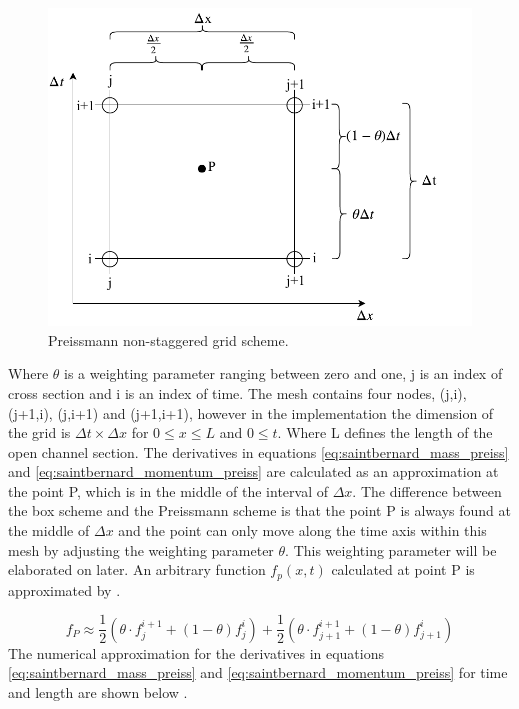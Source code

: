 \begin{figure}[H]
\centering
%
\includegraphics[width=.8\textwidth]{report/simulation/pictures/preissmann_scheme.pdf}
\caption{Preissmann non-staggered grid scheme.}
\label{fig:preissmann_grid_scheme}
\end{figure}
Where $\theta$ is a weighting parameter ranging between zero and one, j is an index of cross section and i is an index of time. The mesh contains four nodes, (j,i), (j+1,i), (j,i+1) and (j+1,i+1), however in the implementation the dimension of the grid is $\Delta t \times \Delta x$ for $0 \leq x \leq L$ and $0\leq t$. Where L defines the length of the open channel section. The derivatives in equations \ref{eq:saintbernard_mass_preiss} and \ref{eq:saintbernard_momentum_preiss} are calculated as an approximation at the point P, which is in the middle of the interval of $\Delta x$.%
The difference between the box scheme and the Preissmann scheme is that the point P is always found at the middle of $\Delta x$ and the point can only move along the time axis within this mesh by adjusting the weighting parameter $\theta$. This weighting parameter will be elaborated on later. An arbitrary function $f_p(x,t)$ calculated at point P is approximated by \cite{numerical_modeling}.

\begin{equation}\label{eq:approximated_function}
    f_P \approx \frac{1}{2} (\theta \cdot f_j^{i+1}+(1-\theta)f_j^i)+\frac{1}{2}(\theta\cdot f_{j+1}^{i+1}+(1-\theta)f_{j+1}^i)
\end{equation}
The numerical approximation for the derivatives in equations \ref{eq:saintbernard_mass_preiss} and \ref{eq:saintbernard_momentum_preiss} for time and length are shown below \cite{numerical_modeling}.

